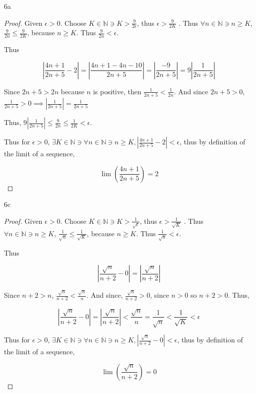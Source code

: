 \documentclass{article}
\newcommand{\N}{\mathbb{N}}
\newcommand{\abs}[1]{\left\lvert #1\right\rvert}
\begin{document}
\begin{PROB}{6a}\label{Problem 6a.}
\end{PROB}
\begin{proof}
    Given $\epsilon > 0$. Choose $K \in \N \ni K > \frac{9}{2\epsilon}$, thus $\epsilon > \frac{9}{2K}$ . Thus $\forall n \in \N \ni n \geq K$, $\frac{9}{2n} \leq \frac{9}{2K}$, because $n \geq K$. Thus $\frac{9}{2n} < \epsilon$. 
    
    
    Thus 
    
    \[
        \abs{\frac{4n + 1}{2n + 5} - 2} = \abs{\frac{4n + 1 - 4n - 10}{2n + 5}} = \abs{\frac{-9}{2n + 5}} = 9 \abs{\frac{1}{2n + 5}}
    \]

    Since $2n + 5 > 2n$ because $n$ is positive, then $\frac{1}{2n + 5} < \frac{1}{2n}$. And since $2n +5 > 0$, $\frac{1}{2n + 5} > 0 \implies \abs{\frac{1}{2n + 5}} = \frac{1}{2n + 5}$ 

    Thus, $9 \abs{\frac{1}{2n + 5}} \leq \frac{9}{2n} \leq \frac{1}{2K} < \epsilon$.  

    Thus for $\epsilon > 0$, $\exists K \in \N \ni \forall n \in \N \ni n \geq K, \abs{\frac{4n + 1}{2n + 5} - 2} < \epsilon$, thus by definition of the limit of a sequence,
    
    \[
        \lim \left(\frac{4n + 1}{2n +5}\right) = 2
    \]
\end{proof}

\bigskip

\begin{PROB}{6c}\label{Problem 6c.}
\end{PROB}
\begin{proof}
    Given $\epsilon > 0$. Choose $K \in \N \ni K > \frac{1}{\sqrt{\epsilon}}$, thus $\epsilon > \frac{1}{\sqrt{K}}$ . Thus $\forall n \in \N \ni n \geq K$, $\frac{1}{\sqrt{n}} \leq \frac{1}{\sqrt{K}}$, because $n \geq K$. Thus $\frac{1}{\sqrt{n}} < \epsilon$.      
    
    
    Thus 
    
    \[
        \abs{\frac{\sqrt{n}}{n + 2} - 0} = \abs{\frac{\sqrt{n}}{n +2}}
    \]

    Since $n + 2 > n$, $\frac{\sqrt{n}}{n + 2} <\frac{\sqrt{n}}{n}$. And since, $\frac{\sqrt{n}}{n + 2}> 0$, since $n >0$ so $n + 2 > 0$. Thus,
    
    
    \[
        \abs{\frac{\sqrt{n}}{n + 2} - 0} = \abs{\frac{\sqrt{n}}{n +2}} < \frac{\sqrt{n}}{n} = \frac{1}{\sqrt{n}} < \frac{1}{\sqrt{K}} < \epsilon
    \]

    Thus for $\epsilon > 0$, $\exists K \in \N \ni \forall n \in \N \ni n \geq K, \abs{\frac{\sqrt{n}}{n + 2} - 0} < \epsilon$, thus by definition of the limit of a sequence,
    
    \[
        \lim \left(\frac{\sqrt{n}}{n + 2}\right) = 0
    \]
\end{proof}
\end{document}
